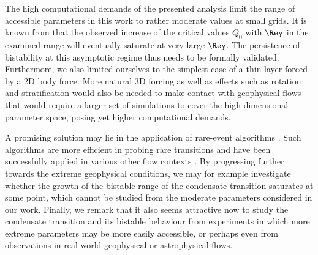 \documentclass[]{jfm}
\begin{document}
The high computational demands of the presented analysis limit the range of accessible parameters in this work to rather moderate values at small grids. It is known from \cite{VanKan2019} that the observed increase of the critical values $Q_0$ with $\Rey$ in the examined range will eventually saturate at very large $\Rey$. The persistence of bistability at this asymptotic regime thus needs to be formally validated. Furthermore, we also limited ourselves to the simplest case of a thin layer forced by a 2D body force. More natural 3D forcing as well as effects such as rotation and stratification would also be needed to make contact with geophysical flows that would require a larger set of simulations to cover the high-dimensional parameter space, posing yet higher computational demands.

A promising solution may lie in the application of rare-event algorithms \citep{Cerou2007,Lestang2018}. Such algorithms are more efficient in probing rare transitions and have been successfully applied in various other flow contexts \citep{Gome2021,Bouchet2019,Rolland2018}. By progressing further towards the extreme geophysical conditions, we may for example investigate whether the growth of the bistable range of the condensate transition saturates at some point, which cannot be studied from the moderate parameters considered in our work. Finally, we remark that it also seems attractive now to study the condensate transition and its bistable behaviour from experiments in which more extreme parameters may be more easily accessible, or perhaps even from observations in real-world geophysical or astrophysical flows.






\end{document}
